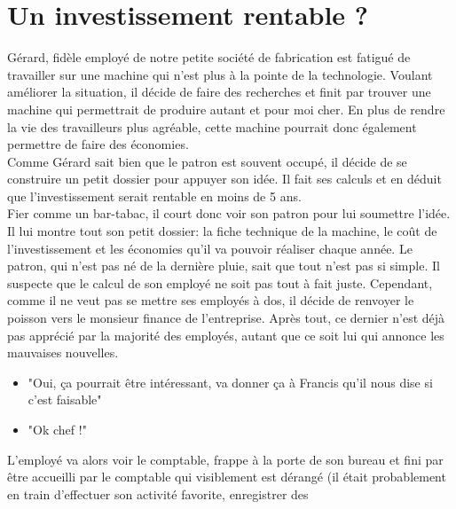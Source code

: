 
\chapter{Un investissement rentable ?}



Gérard, fidèle employé de notre petite société de
fabrication est fatigué de travailler sur une machine qui n'est 
plus à la pointe de la technologie. 
Voulant améliorer la situation, il décide de faire des 
recherches et finit par trouver une machine qui permettrait de 
produire autant et pour moi cher.
En plus de rendre la vie des travailleurs plus agréable, 
cette machine pourrait donc également permettre de faire 
des économies. \\
\hspace*{\parindent}Comme Gérard sait bien que le patron est souvent occupé, 
il décide de se construire un petit dossier pour appuyer son idée.
Il fait ses calculs et en déduit que l'investissement serait 
rentable en moins de 5 ans. \\
\hspace*{\parindent}Fier comme un bar-tabac, 
il court donc voir son patron pour lui 
soumettre l'idée. Il lui montre tout son petit dossier: la 
fiche technique de la machine, le coût de l'investissement 
et les économies qu'il va pouvoir réaliser chaque année.
Le patron, qui n'est pas né de la dernière pluie, sait que 
tout n'est pas si simple. Il suspecte que le calcul de 
son employé ne soit pas tout à fait juste. 
Cependant, comme il ne veut pas se mettre ses employés à dos, 
il décide de renvoyer le poisson vers le monsieur finance 
de l'entreprise. Après tout, ce dernier n'est déjà pas apprécié 
par la majorité des employés, autant que ce soit lui qui 
annonce les mauvaises nouvelles.
\begin{itemize}
  \item "Oui, ça pourrait être intéressant, va donner ça à 
  Francis qu'il nous dise si c'est faisable"
  \item "Ok chef !"
\end{itemize}
\hspace*{\parindent}L'employé va alors voir le comptable, 
frappe à la porte de son bureau et fini par être accueilli par le 
comptable qui visiblement est dérangé (il était probablement 
en train d'effectuer son activité favorite, enregistrer des 
